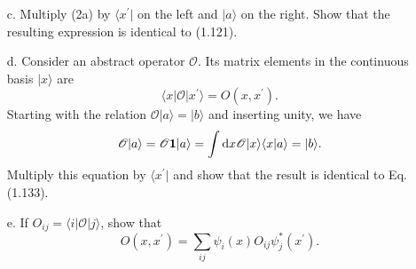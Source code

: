 \documentclass[a4paper]{book}
\newcounter{exercise}[chapter]
\newcommand*{\dif}{\mathop{}\!\mathrm{d}}
\newcommand{\I}{{\bf 1}}
\begin{document}
\begin{exercise}
\begin{enumerate}
	\item[c.] Multiply (2a) by $\langle x^\prime |$ on the left and $| a \rangle$ on the right. Show that the resulting expression is identical to (1.121).
	
	\item[d.] Consider an abstract operator $\mathscr{O}$. Its matrix elements in the continuous basis $| x \rangle$ are
	\begin{equation*}
		\langle x | \mathscr{O} | x^\prime \rangle = O(x,x^\prime).
	\end{equation*}
	Starting with the relation $\mathscr{O}| a \rangle = | b \rangle$ and inserting unity, we have
	\begin{equation*}
		\mathscr{O} | a \rangle = \mathscr{O} \I | a \rangle = \int \dif x \mathscr{O} | x \rangle \langle x | a \rangle = | b \rangle .
	\end{equation*}
	Multiply this equation by $\langle x^\prime |$ and show that the result is identical to Eq.(1.133).
	
	\item[e.] If $O_{ij} = \langle i | \mathscr{O} | j \rangle$, show that
	\begin{equation*}
		O(x,x^\prime) = \sum_{ij} \psi_i(x) O_{ij} \psi^*_j(x^\prime).
	\end{equation*}
	
	\end{enumerate}

	\end{exercise}
	
\end{document}

